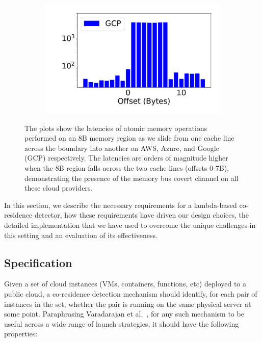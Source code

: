 \begin{figure}[h!]
\begin{subfigure}{.33\textwidth}
  \centering
  \includegraphics[width=.99\linewidth]{fig/membus_gcp.pdf}
\end{subfigure}
\caption{The plots show the latencies of atomic memory operations performed on
        an 8B memory region as we slide from one cache line across the boundary into
        another on AWS, Azure, and Google (GCP) respectively.  The latencies are orders
        of magnitude higher when the 8B region falls across the two cache lines (offsets
        0-7B), demonstrating the presence of the memory bus covert channel on all these
        cloud providers. \label{fig:membus_clouds}}
\label{fig:fig}
\end{figure}


In this section, we describe the necessary requirements for a lambda-based 
co-residence detector, how these requirements have driven our design choices, 
the detailed implementation that we have used to overcome the unique challenges 
in this setting and an evaluation of its effectiveness.

\subsection{Specification}
Given a set of cloud instances (VMs, containers, functions, etc) deployed to a
public cloud, a co-residence detection mechanism should identify, for each pair
of instances in the set, whether the pair is running on the same physical
server at some point. Paraphrasing Varadarajan et al.~\cite{varadarajan2015},
for any such mechanism to be useful across a wide range of launch strategies, it
should have the following properties:

